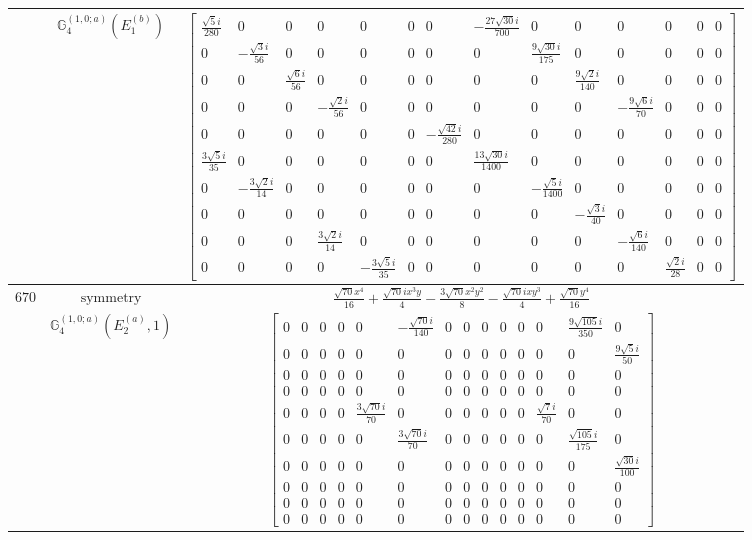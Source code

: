 \documentclass[fleqn,8pt,landscape]{jsarticle}
\begin{document}
\begin{longtable}{ccc}
$  $ & $ \mathbb{G}_{4}^{(1,0;a)}(E_{1}^{(b)}) $ & $ \begin{bmatrix} \frac{\sqrt{5} i}{280} & 0 & 0 & 0 & 0 & 0 & 0 & - \frac{27 \sqrt{30} i}{700} & 0 & 0 & 0 & 0 & 0 & 0 \\ 0 & - \frac{\sqrt{3} i}{56} & 0 & 0 & 0 & 0 & 0 & 0 & \frac{9 \sqrt{30} i}{175} & 0 & 0 & 0 & 0 & 0 \\ 0 & 0 & \frac{\sqrt{6} i}{56} & 0 & 0 & 0 & 0 & 0 & 0 & \frac{9 \sqrt{2} i}{140} & 0 & 0 & 0 & 0 \\ 0 & 0 & 0 & - \frac{\sqrt{2} i}{56} & 0 & 0 & 0 & 0 & 0 & 0 & - \frac{9 \sqrt{6} i}{70} & 0 & 0 & 0 \\ 0 & 0 & 0 & 0 & 0 & 0 & - \frac{\sqrt{42} i}{280} & 0 & 0 & 0 & 0 & 0 & 0 & 0 \\ \frac{3 \sqrt{5} i}{35} & 0 & 0 & 0 & 0 & 0 & 0 & \frac{13 \sqrt{30} i}{1400} & 0 & 0 & 0 & 0 & 0 & 0 \\ 0 & - \frac{3 \sqrt{2} i}{14} & 0 & 0 & 0 & 0 & 0 & 0 & - \frac{\sqrt{5} i}{1400} & 0 & 0 & 0 & 0 & 0 \\ 0 & 0 & 0 & 0 & 0 & 0 & 0 & 0 & 0 & - \frac{\sqrt{3} i}{40} & 0 & 0 & 0 & 0 \\ 0 & 0 & 0 & \frac{3 \sqrt{2} i}{14} & 0 & 0 & 0 & 0 & 0 & 0 & - \frac{\sqrt{6} i}{140} & 0 & 0 & 0 \\ 0 & 0 & 0 & 0 & - \frac{3 \sqrt{5} i}{35} & 0 & 0 & 0 & 0 & 0 & 0 & \frac{\sqrt{2} i}{28} & 0 & 0 \end{bmatrix} $ \\ \hline
$ 670 $ & $ \text{symmetry} $ & $ \frac{\sqrt{70} x^{4}}{16} + \frac{\sqrt{70} i x^{3} y}{4} - \frac{3 \sqrt{70} x^{2} y^{2}}{8} - \frac{\sqrt{70} i x y^{3}}{4} + \frac{\sqrt{70} y^{4}}{16} $ \\
$  $ & $ \mathbb{G}_{4}^{(1,0;a)}(E_{2}^{(a)},1) $ & $ \begin{bmatrix} 0 & 0 & 0 & 0 & 0 & - \frac{\sqrt{70} i}{140} & 0 & 0 & 0 & 0 & 0 & 0 & \frac{9 \sqrt{105} i}{350} & 0 \\ 0 & 0 & 0 & 0 & 0 & 0 & 0 & 0 & 0 & 0 & 0 & 0 & 0 & \frac{9 \sqrt{5} i}{50} \\ 0 & 0 & 0 & 0 & 0 & 0 & 0 & 0 & 0 & 0 & 0 & 0 & 0 & 0 \\ 0 & 0 & 0 & 0 & 0 & 0 & 0 & 0 & 0 & 0 & 0 & 0 & 0 & 0 \\ 0 & 0 & 0 & 0 & \frac{3 \sqrt{70} i}{70} & 0 & 0 & 0 & 0 & 0 & 0 & \frac{\sqrt{7} i}{70} & 0 & 0 \\ 0 & 0 & 0 & 0 & 0 & \frac{3 \sqrt{70} i}{70} & 0 & 0 & 0 & 0 & 0 & 0 & \frac{\sqrt{105} i}{175} & 0 \\ 0 & 0 & 0 & 0 & 0 & 0 & 0 & 0 & 0 & 0 & 0 & 0 & 0 & \frac{\sqrt{30} i}{100} \\ 0 & 0 & 0 & 0 & 0 & 0 & 0 & 0 & 0 & 0 & 0 & 0 & 0 & 0 \\ 0 & 0 & 0 & 0 & 0 & 0 & 0 & 0 & 0 & 0 & 0 & 0 & 0 & 0 \\ 0 & 0 & 0 & 0 & 0 & 0 & 0 & 0 & 0 & 0 & 0 & 0 & 0 & 0 \end{bmatrix} $ \\ \hline

\end{longtable}
\end{document}
